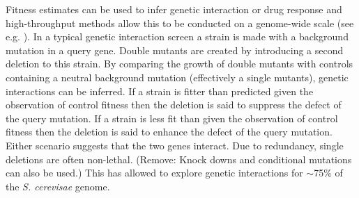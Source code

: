 

Fitness estimates can be used to infer genetic interaction or drug
response and high-throughput methods allow this to be conducted on a
genome-wide scale (see e.g. \citet{Costanzo2010,Andrew2013}). In a
typical genetic interaction screen a strain is made with a background
mutation in a query gene. Double mutants are created by introducing a
second deletion to this strain. By comparing the growth of double
mutants with controls containing a neutral background mutation
(effectively a single mutants), genetic interactions can be
inferred. If a strain is fitter than predicted given the observation
of control fitness then the deletion is said to suppress the defect of
the query mutation. If a strain is less fit than given the observation
of control fitness then the deletion is said to enhance the defect of
the query mutation. Either scenario suggests that the two genes
interact. Due to redundancy, single deletions are often
non-lethal. (Remove: Knock downs and conditional mutations can also be
used.) This has allowed \citet{Costanzo2010} to explore genetic
interactions for \(\sim\)75\% of the \textit{S. cerevisae} genome.


